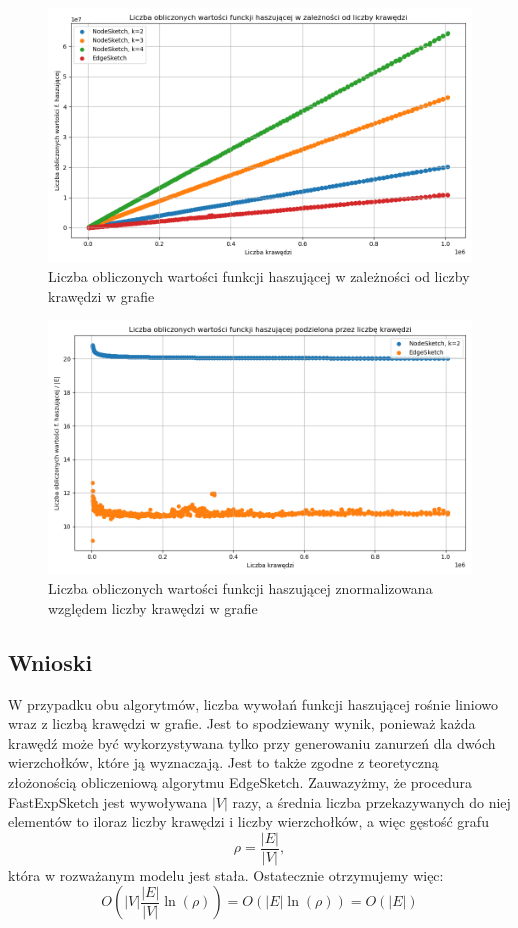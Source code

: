 \begin{figure}[!ht]
    \includegraphics[width=16cm]{img/calculated_hashes_vs_edges_all.png}
    \centering
    \caption[Liczba operacji]{Liczba obliczonych wartości funkcji haszującej w zależności od liczby krawędzi w grafie}
    \label{fig:calculated_hashes_vs_edges_all}
\end{figure}

\begin{figure}[!ht]
    \includegraphics[width=16cm]{img/calculated_hashes_vs_edges_relative.png}
    \centering
    \caption[Liczba operacji znormalizowana]{Liczba obliczonych wartości funkcji haszującej znormalizowana względem liczby krawędzi w grafie}
    \label{fig:calculated_hashes_vs_edges_relative}
\end{figure}

\subsection{Wnioski}
W przypadku obu algorytmów, liczba wywołań funkcji haszującej rośnie liniowo wraz z liczbą krawędzi w grafie. Jest to spodziewany wynik, ponieważ każda krawędź może być wykorzystywana tylko przy generowaniu zanurzeń dla dwóch wierzchołków, które ją wyznaczają. Jest to także zgodne z teoretyczną złożonością obliczeniową algorytmu EdgeSketch. Zauwazyżmy, że procedura FastExpSketch jest wywoływana $|V|$ razy, a średnia liczba przekazywanych do niej elementów to iloraz liczby krawędzi i liczby wierzchołków, a więc gęstość grafu 
\[
    \rho = \frac{|E|}{|V|},
\]
która w rozważanym modelu jest stała. Ostatecznie otrzymujemy więc:
\[
    O(|V| \frac{|E|}{|V|} \ln(\rho)) = O(|E| \ln(\rho)) = O(|E|)
\]

